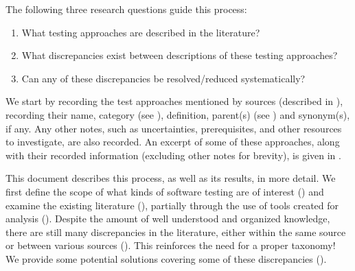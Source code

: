 \ifnotpaper
    The following three research questions guide this process:
    \begin{enumerate}
        \item What testing approaches are described in the literature?
        \item What discrepancies exist between descriptions of these testing
              approaches?
        \item Can any of these discrepancies be resolved/reduced systematically?
    \end{enumerate}
    We start by recording the \approachCount{} test approaches mentioned by
    \srcCount{} sources (described in ), recording their name,
    category (see ), definition, parent(s)
    (see )
    and synonym(s), if any. Any other notes, such as uncertainties,
    prerequisites, and other resources to investigate, are also recorded. An
    excerpt of some of these approaches, along with their recorded information
    (excluding other notes for brevity), is given in
    .
\fi

This document describes this process, as well as its results, in more detail.
We first define the scope of
what kinds of software testing are of interest () and examine the
existing literature ()\ifnotpaper, partially through the use
of tools created for analysis ()\fi. Despite the amount of well
understood and organized knowledge, there are still many discrepancies in the
literature, either within the same source or between various
sources (). This reinforces the need for a proper taxonomy! We
provide some potential solutions covering some of these discrepancies
().

\ifnotpaper
    \begin{bigLandscape}
        
    \end{bigLandscape}
\fi